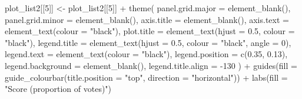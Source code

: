 \documentclass[
  11pt,
  oneside]{book}
\newenvironment{Shaded}{\begin{snugshade}}{\end{snugshade}}
\newcommand{\AttributeTok}[1]{\textcolor[rgb]{0.77,0.63,0.00}{#1}}
\newcommand{\DecValTok}[1]{\textcolor[rgb]{0.00,0.00,0.81}{#1}}
\newcommand{\FloatTok}[1]{\textcolor[rgb]{0.00,0.00,0.81}{#1}}
\newcommand{\FunctionTok}[1]{\textcolor[rgb]{0.00,0.00,0.00}{#1}}
\newcommand{\NormalTok}[1]{#1}
\newcommand{\OtherTok}[1]{\textcolor[rgb]{0.56,0.35,0.01}{#1}}
\newcommand{\SpecialCharTok}[1]{\textcolor[rgb]{0.00,0.00,0.00}{#1}}
\newcommand{\StringTok}[1]{\textcolor[rgb]{0.31,0.60,0.02}{#1}}
\begin{document}
\begin{Shaded}
\begin{Highlighting}[]
\NormalTok{plot\_list2[[}\DecValTok{5}\NormalTok{]] }\OtherTok{\textless{}{-}}\NormalTok{ plot\_list2[[}\DecValTok{5}\NormalTok{]] }\SpecialCharTok{+}
  \FunctionTok{theme}\NormalTok{(}
    \AttributeTok{panel.grid.major =} \FunctionTok{element\_blank}\NormalTok{(),}
    \AttributeTok{panel.grid.minor =} \FunctionTok{element\_blank}\NormalTok{(),}
    \AttributeTok{axis.title =} \FunctionTok{element\_blank}\NormalTok{(),}
    \AttributeTok{axis.text =} \FunctionTok{element\_text}\NormalTok{(}\AttributeTok{colour =} \StringTok{"black"}\NormalTok{),}
    \AttributeTok{plot.title =} \FunctionTok{element\_text}\NormalTok{(}\AttributeTok{hjust =} \FloatTok{0.5}\NormalTok{, }\AttributeTok{colour =} \StringTok{"black"}\NormalTok{),}
    \AttributeTok{legend.title =} \FunctionTok{element\_text}\NormalTok{(}\AttributeTok{hjust =} \FloatTok{0.5}\NormalTok{, }\AttributeTok{colour =} \StringTok{"black"}\NormalTok{, }\AttributeTok{angle =} \DecValTok{0}\NormalTok{),}
    \AttributeTok{legend.text =} \FunctionTok{element\_text}\NormalTok{(}\AttributeTok{colour =} \StringTok{"black"}\NormalTok{),}
    \AttributeTok{legend.position =} \FunctionTok{c}\NormalTok{(}\FloatTok{0.35}\NormalTok{, }\FloatTok{0.13}\NormalTok{),}
    \AttributeTok{legend.background =} \FunctionTok{element\_blank}\NormalTok{(),}
    \AttributeTok{legend.title.align =} \SpecialCharTok{{-}}\DecValTok{130}
\NormalTok{  ) }\SpecialCharTok{+}
  \FunctionTok{guides}\NormalTok{(}\AttributeTok{fill =} \FunctionTok{guide\_colourbar}\NormalTok{(}\AttributeTok{title.position =} \StringTok{"top"}\NormalTok{, }\AttributeTok{direction =} \StringTok{"horizontal"}\NormalTok{)) }\SpecialCharTok{+}
  \FunctionTok{labs}\NormalTok{(}\AttributeTok{fill =} \StringTok{"Score (proportion of votes)"}\NormalTok{)}


\end{Highlighting}
\end{Shaded}
\end{document}
